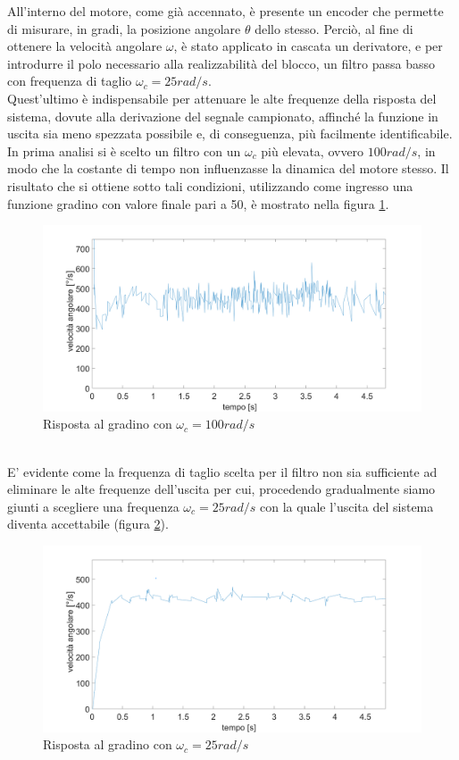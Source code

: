All'interno del motore, come già accennato, è presente un encoder che permette di misurare, in gradi, la posizione angolare $\theta$ dello stesso.
Perciò, al fine di ottenere la velocità angolare $\omega$, è stato applicato in cascata un derivatore, e per introdurre il polo necessario alla realizzabilità del blocco, un filtro passa basso con frequenza di taglio $\omega_c=25rad/s$. \\Quest'ultimo è indispensabile per attenuare le alte frequenze della risposta del sistema, dovute alla derivazione del segnale campionato, affinché la funzione in uscita sia meno spezzata possibile e, di conseguenza, più facilmente identificabile.\\
In prima analisi si è scelto un filtro con un $\omega_c$ più elevata, ovvero $100rad/s$, in modo che la costante di tempo non influenzasse la dinamica del motore stesso.
Il risultato che si ottiene sotto tali condizioni, utilizzando come ingresso una funzione gradino con valore finale pari a 50, è mostrato nella figura \ref{motore50StepCamp1000Polo100}.
\begin{figure}[ht]
	\centering
	\includegraphics[width=\textwidth]{motore50StepCamp1000Polo100.png}
	\caption{Risposta al gradino con $\omega_c=100rad/s$ }
	\label{motore50StepCamp1000Polo100}
\end{figure}
\\E' evidente come la frequenza di taglio scelta per il filtro non sia sufficiente ad eliminare le alte frequenze dell'uscita per cui, procedendo gradualmente siamo giunti a  scegliere una frequenza $\omega_c = 25rad/s$ con la quale l'uscita del sistema diventa accettabile (figura \ref{motore50StepCamp1000}).
\begin{figure}[ht]
\centering
\includegraphics[width=\textwidth]{motore50StepCamp1000.png}
\caption{Risposta al gradino con $\omega_c=25rad/s$}
\label{motore50StepCamp1000}
\end{figure}
